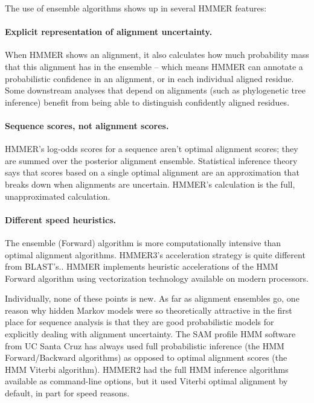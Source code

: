 The use of ensemble algorithms shows up in several HMMER features:

\paragraph{Explicit representation of alignment uncertainty.}
  When HMMER shows an alignment, it also calculates how much
  probability mass that this alignment has in the ensemble -- which
  means HMMER can annotate a probabilistic confidence in an alignment,
  or in each individual aligned residue. Some downstream analyses that
  depend on alignments (such as phylogenetic tree inference) benefit
  from being able to distinguish confidently aligned residues.

\paragraph{Sequence scores, not alignment scores.} HMMER's
  log-odds scores for a sequence aren't optimal alignment scores; they
  are summed over the posterior alignment ensemble. Statistical
  inference theory says that scores based on a single optimal
  alignment are an approximation that breaks down when alignments are
  uncertain. HMMER's calculation is the full, unapproximated
  calculation.
 
\paragraph{Different speed heuristics.} The ensemble (Forward) algorithm is more
  computationally intensive than optimal alignment algorithms.
  HMMER3's acceleration strategy is quite different from
  BLAST's.\cite{Eddy11}.  HMMER implements heuristic accelerations of
  the HMM Forward algorithm using vectorization technology available
  on modern processors.\vspace{1em}

Individually, none of these points is new. As far as alignment
ensembles go, one reason why hidden Markov models were so
theoretically attractive in the first place for sequence analysis is
that they are good probabilistic models for explicitly dealing with
alignment uncertainty. The SAM profile HMM software from UC Santa Cruz
has always used full probabilistic inference (the HMM Forward/Backward
algorithms) as opposed to optimal alignment scores (the HMM Viterbi
algorithm). HMMER2 had the full HMM inference algorithms available as
command-line options, but it used Viterbi optimal alignment by
default, in part for speed reasons.

